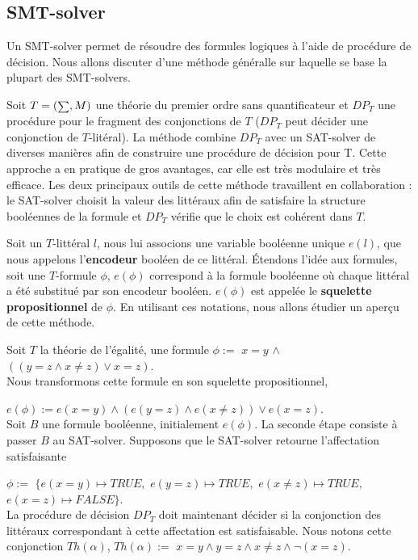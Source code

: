 \documentclass[11pt,openany]{article}
\newcommand\smallsum{\mathsmaller\sum}
\begin{document}
 	\subsection{SMT-solver}
	 		Un SMT-solver permet de r\'esoudre des formules logiques \`a l'aide de proc\'edure de d\'ecision. Nous allons discuter d'une m\'ethode g\'en\'eralle sur laquelle se base la plupart des SMT-solvers.\\ \par Soit $T=(\smallsum,M)$ une th\'eorie du premier ordre sans quantificateur et $DP_{T}$ une proc\'edure pour le fragment des conjonctions de $T$ ($DP_{T}$ peut d\'ecider une conjonction de $T$-lit\'eral). La m\'ethode combine $DP_{T}$ avec un SAT-solver  de diverses mani\`eres afin de construire une proc\'edure de d\'ecision pour T. Cette approche a en pratique de gros avantages, car elle est tr\`es modulaire et tr\`es efficace. Les deux principaux outils de cette m\'ethode travaillent en collaboration : le SAT-solver choisit la valeur des litt\'eraux afin de satisfaire la structure bool\'eennes de la formule et $DP_{T}$ v\'erifie que le choix est coh\'erent dans $T$.\par
	 		Soit un $T$-litt\'eral $l$, nous lui associons une variable bool\'eenne unique $e(l)$, que nous appelons l'\textbf{encodeur} bool\'een de ce litt\'eral. \'Etendons l'id\'ee aux formules, soit une $T$-formule $\phi$, $e(\phi)$ correspond \`a la formule bool\'eenne o\`u chaque litt\'eral a \'et\'e substitu\'e par son encodeur bool\'een. $e(\phi)$ est appel\'ee le \textbf{squelette propositionnel} de $\phi$. En utilisant ces notations, nous allons \'etudier un aper\c{c}u de cette m\'ethode.\par 
	 		Soit $T$ la th\'eorie de l'\'egalit\'e, une formule	$\phi :=$ $x=y$ $\land$ $((y=z\land x\neq z)\lor x=z)$.\\
	 		Nous transformons cette formule en son squelette propositionnel,\par $e(\phi):= e(x=y)\land (e(y=z)\land e(x\neq z))\lor e(x=z)$.\\
Soit $B$ une formule bool\'eenne, initialement $e(\phi)$. La seconde \'etape consiste \`a passer $B$ au SAT-solver. Supposons que le SAT-solver retourne l'affectation satisfaisante\par
$\phi:=$ $\{e(x=y)\mapsto TRUE, $ $e(y=z)\mapsto TRUE,$ $e(x\neq z)\mapsto TRUE,$ $e(x=z)\mapsto FALSE\}$.\\
La proc\'edure de d\'ecision $DP_{T}$ doit maintenant d\'ecider si la conjonction des litt\'eraux correspondant \`a cette affectation est satisfaisable. Nous notons cette conjonction $Th(\alpha)$, $Th(\alpha):=$ $x=y\land y=z\land x\neq z\land \neg(x=z)$.\par
\end{document}
